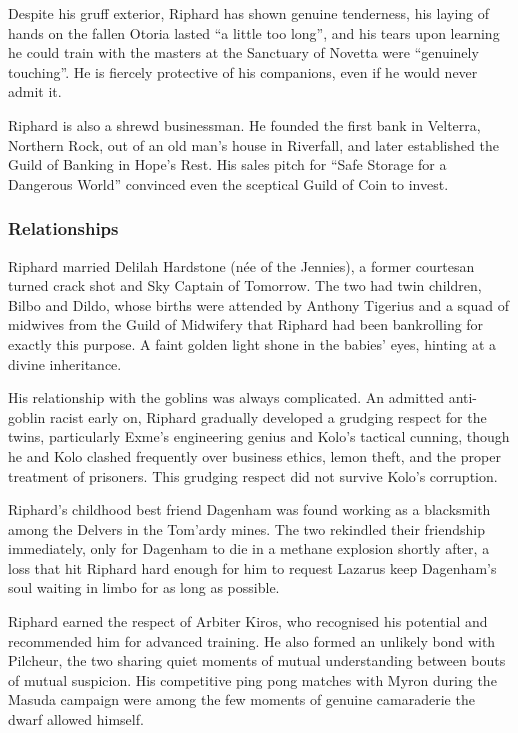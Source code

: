Despite his gruff exterior, Riphard has shown genuine tenderness, his laying of hands on the fallen Otoria lasted ``a little too long'', and his tears upon learning he could train with the masters at the Sanctuary of Novetta were ``genuinely touching''.  He is fiercely protective of his companions, even if he would never admit it.

Riphard is also a shrewd businessman.  He founded the first bank in Velterra, Northern Rock, out of an old man's house in Riverfall, and later established the Guild of Banking in Hope's Rest.  His sales pitch for ``Safe Storage for a Dangerous World'' convinced even the sceptical Guild of Coin to invest.

\subsubsection{Relationships}

Riphard married Delilah Hardstone (n\'{e}e of the Jennies), a former courtesan turned crack shot and Sky Captain of Tomorrow.  The two had twin children, Bilbo and Dildo, whose births were attended by Anthony Tigerius and a squad of midwives from the Guild of Midwifery that Riphard had been bankrolling for exactly this purpose.  A faint golden light shone in the babies' eyes, hinting at a divine inheritance.

His relationship with the goblins was always complicated.  An admitted anti-goblin racist early on, Riphard gradually developed a grudging respect for the twins, particularly Exme's engineering genius and Kolo's tactical cunning, though he and Kolo clashed frequently over business ethics, lemon theft, and the proper treatment of prisoners.  This grudging respect did not survive Kolo's corruption.

Riphard's childhood best friend Dagenham was found working as a blacksmith among the Delvers in the Tom'ardy mines.  The two rekindled their friendship immediately, only for Dagenham to die in a methane explosion shortly after, a loss that hit Riphard hard enough for him to request Lazarus keep Dagenham's soul waiting in limbo for as long as possible.

Riphard earned the respect of Arbiter Kiros, who recognised his potential and recommended him for advanced training.  He also formed an unlikely bond with Pilcheur, the two sharing quiet moments of mutual understanding between bouts of mutual suspicion.  His competitive ping pong matches with Myron during the Masuda campaign were among the few moments of genuine camaraderie the dwarf allowed himself.

